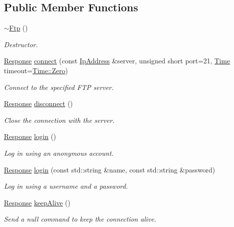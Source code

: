 \subsection*{Public Member Functions}
\begin{DoxyCompactItemize}
\item 
\hyperlink{classsf_1_1_ftp_a2edfa8e9009caf27bce74459ae76dc52}{$\sim$\+Ftp} ()
\begin{DoxyCompactList}\small\item\em Destructor. \end{DoxyCompactList}\item 
\hyperlink{classsf_1_1_ftp_1_1_response}{Response} \hyperlink{classsf_1_1_ftp_af02fb3de3f450a50a27981961c69c860}{connect} (const \hyperlink{classsf_1_1_ip_address}{Ip\+Address} \&server, unsigned short port=21, \hyperlink{classsf_1_1_time}{Time} timeout=\hyperlink{classsf_1_1_time_a8db127b632fa8da21550e7282af11fa0}{Time\+::\+Zero})
\begin{DoxyCompactList}\small\item\em Connect to the specified F\+TP server. \end{DoxyCompactList}\item 
\hyperlink{classsf_1_1_ftp_1_1_response}{Response} \hyperlink{classsf_1_1_ftp_acf7459926f3391cd06bf84337ed6a0f4}{disconnect} ()
\begin{DoxyCompactList}\small\item\em Close the connection with the server. \end{DoxyCompactList}\item 
\hyperlink{classsf_1_1_ftp_1_1_response}{Response} \hyperlink{classsf_1_1_ftp_a686262bc377584cd50e52e1576aa3a9b}{login} ()
\begin{DoxyCompactList}\small\item\em Log in using an anonymous account. \end{DoxyCompactList}\item 
\hyperlink{classsf_1_1_ftp_1_1_response}{Response} \hyperlink{classsf_1_1_ftp_a99d8114793c1659e9d51d45cecdcd965}{login} (const std\+::string \&name, const std\+::string \&password)
\begin{DoxyCompactList}\small\item\em Log in using a username and a password. \end{DoxyCompactList}\item 
\hyperlink{classsf_1_1_ftp_1_1_response}{Response} \hyperlink{classsf_1_1_ftp_aa1127d442b4acb2105aa8060a39d04fc}{keep\+Alive} ()
\begin{DoxyCompactList}\small\item\em Send a null command to keep the connection alive. \end{DoxyCompactList}\item 

\end{DoxyCompactItemize}
